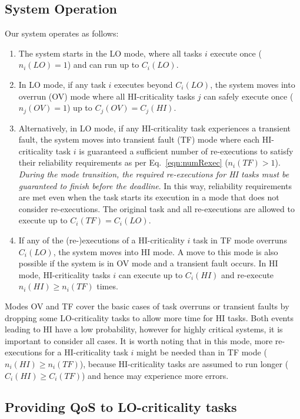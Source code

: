 \documentclass[conference]{IEEEtran}
\begin{document}
\subsection{System Operation}
Our system operates as follows:
\begin{enumerate}[topsep=-5pt]
\item  The system starts in the LO mode, where all tasks $i$ execute once ($n_i(LO)=1$) and can run up to $C_i(LO)$.
\item  In LO mode, if any task $i$ executes beyond $C_i(LO)$, the system moves into overrun (OV) mode where all HI-criticality tasks $j$ can safely execute once ($n_j(OV)=1$) up to $C_j(OV) = C_j(HI)$.
\item  Alternatively, in LO mode, if any HI-criticality task experiences a transient fault, the system moves into transient fault (TF) mode where each HI-criticality task $i$ is guaranteed a sufficient number of re-executions to satisfy their reliability requirements as per Eq.~\eqref{eqn:numRexec} ($n_i(TF)>1$). {\it During the mode transition, the required re-executions for HI tasks must be guaranteed to finish before the deadline}. In this way, reliability requirements are met even when the task starts its execution in a mode that does not consider re-executions. The original task and all re-executions are allowed to execute up to $C_i(TF) = C_i(LO)$.
\item  If any of the (re-)executions of a HI-criticality $i$ task in TF mode overruns $C_i(LO)$, the system moves into HI mode. A move to this mode is also possible if the system is in OV mode and a transient fault occurs. In HI mode, HI-criticality tasks $i$ can execute up to $C_i(HI)$ and re-execute $n_i(HI) \ge n_i(TF)$ times.
\end{enumerate}

Modes OV and TF cover the basic cases of task overruns or transient faults by dropping some LO-criticality tasks to allow more time for HI tasks. Both events leading to HI have a low probability, however for highly critical systems, it is important to consider all cases. It is worth noting that in this mode, more re-executions for a HI-criticality task $i$ might be needed than in TF mode ($n_i(HI) \ge n_i(TF)$), because HI-criticality tasks are assumed to run longer ($C_i(HI) \ge C_i(TF)$) and hence may experience more errors.

\subsection{Providing QoS to LO-criticality tasks}
\end{document}
